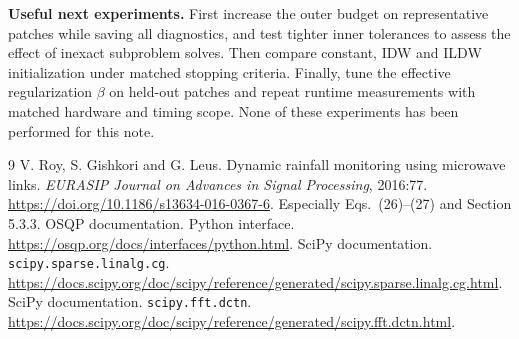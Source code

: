 \documentclass[11pt,a4paper]{article}
\begin{document}
\textbf{Useful next experiments.} First increase the outer budget on representative patches while saving all diagnostics, and test tighter inner tolerances to assess the effect of inexact subproblem solves. Then compare constant, IDW and ILDW initialization under matched stopping criteria. Finally, tune the effective regularization $\beta$ on held-out patches and repeat runtime measurements with matched hardware and timing scope. None of these experiments has been performed for this note.
\begin{thebibliography}{9}
 V. Roy, S. Gishkori and G. Leus. Dynamic rainfall monitoring using microwave links. \emph{EURASIP Journal on Advances in Signal Processing}, 2016:77. \url{https://doi.org/10.1186/s13634-016-0367-6}. Especially Eqs.~(26)--(27) and Section 5.3.3.
 OSQP documentation. Python interface. \url{https://osqp.org/docs/interfaces/python.html}.
 SciPy documentation. \texttt{scipy.sparse.linalg.cg}. \url{https://docs.scipy.org/doc/scipy/reference/generated/scipy.sparse.linalg.cg.html}.
 SciPy documentation. \texttt{scipy.fft.dctn}. \url{https://docs.scipy.org/doc/scipy/reference/generated/scipy.fft.dctn.html}.
\end{thebibliography}
\end{document}
